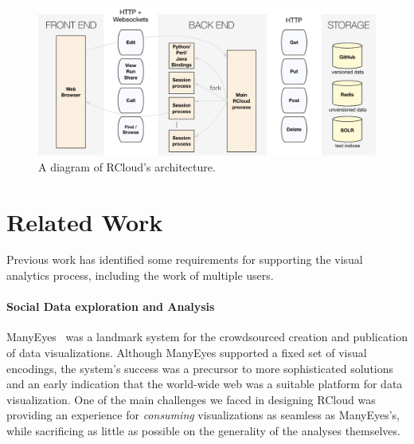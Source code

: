 \begin{figure}
\centering
\includegraphics[width=.75\linewidth]{fig/system/system.pdf}
\caption{\label{fig:system}A diagram of RCloud's architecture. }
\end{figure}

\section{Related Work\label{sec:related}}

Previous work has identified some requirements for supporting the
visual analytics process, including the work of multiple users.

\paragraph*{Social Data exploration and Analysis}
ManyEyes~\cite{Viegas:2007:MAS} was a landmark system for the
crowdsourced creation and publication of data
visualizations. Although ManyEyes supported a fixed set of
visual encodings, the system's success was a precursor to more
sophisticated solutions and an early indication that the world-wide
web was a suitable platform for data visualization. One of the main
challenges we faced in designing RCloud was providing an experience
for \emph{consuming} visualizations as seamless as ManyEyes's, while
sacrificing as little as possible on the generality of the analyses
themselves.


